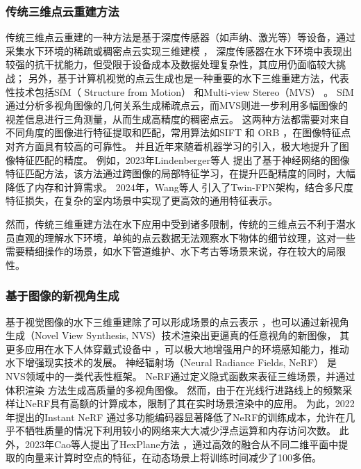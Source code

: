 \subsubsection{传统三维点云重建方法}
传统三维点云重建的一种方法是基于深度传感器（如声纳、激光等）等设备，通过采集水下环境的稀疏或稠密点云实现三维建模 \cite{sonar1}\cite{sonar2}，
深度传感器在水下环境中表现出较强的抗干扰能力，但受限于设备成本及数据处理复杂性，其应用仍面临较大挑战；
另外，基于计算机视觉的点云生成也是一种重要的水下三维重建方法，代表性技术包括SfM（ Structure from Motion）\cite{sfm1, sfm2} 和Multi-view Stereo（MVS） \cite{mvs}。
SfM通过分析多视角图像的几何关系生成稀疏点云，而MVS则进一步利用多幅图像的视差信息进行三角测量，从而生成高精度的稠密点云。
这两种方法都需要对来自不同角度的图像进行特征提取和匹配，常用算法如SIFT \cite{sift} 和 ORB \cite{orb}，在图像特征点对齐方面具有较高的可靠性。
并且近年来随着机器学习的引入，极大地提升了图像特征匹配的精度。
例如，2023年Lindenberger等人 \cite{lightglue} 提出了基于神经网络的图像特征匹配方法，该方法通过跨图像的局部特征学习，在提升匹配精度的同时，大幅降低了内存和计算需求。
2024年，Wang等人 \cite{enhancing-mvs} 引入了Twin-FPN架构，结合多尺度特征损失，在复杂的室内场景中实现了更高效的通用特征表示。

然而，传统三维重建方法在水下应用中受到诸多限制，传统的三维点云不利于潜水员直观的理解水下环境，单纯的点云数据无法观察水下物体的细节纹理，这对一些需要精细操作的场景，如水下管道维护、水下考古等场景来说，存在较大的局限性。


\subsubsection{基于图像的新视角生成}
基于视觉图像的水下三维重建除了可以形成场景的点云表示\cite{vision_recon} ，也可以通过新视角生成（Novel View Synthesis, NVS）技术渲染出更逼真的任意视角的新图像，
其更多应用在水下人体穿戴式设备中 \cite{Xia2023}\cite{underwater_perception}，可以极大地增强用户的环境感知能力，推动水下增强现实技术的发展。
神经辐射场（Neural Radiance Fields, NeRF） \cite{nerf}\cite{Mip_nerf360} 是NVS领域中的一类代表性框架。
NeRF通过定义隐式函数来表征三维场景，并通过体积渲染 \cite{volume_render} 方法生成高质量的多视角图像。
然而，由于在光线行进路线上的频繁采样让NeRF具有高额的计算成本，限制了其在实时场景渲染中的应用。
为此，2022年提出的Instant NeRF \cite{instant_nerf} 通过多功能编码器显著降低了NeRF的训练成本，允许在几乎不牺牲质量的情况下利用较小的网络来大大减少浮点运算和内存访问次数。
此外，2023年Cao等人提出了HexPlane方法 \cite{hex_plane}，通过高效的融合从不同二维平面中提取的向量来计算时空点的特征，在动态场景上将训练时间减少了100多倍。

